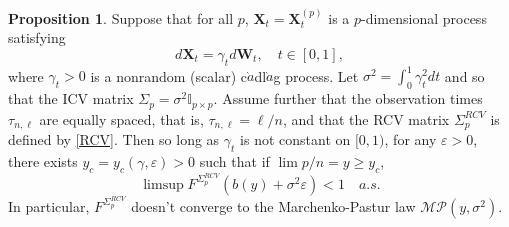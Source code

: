 \documentclass[a4paper,11pt]{article}
\theoremstyle{plain}
\theoremstyle{definition}
\newtheorem{prps}[thm]{Proposition}
\begin{document}
	\begin{prps}
		Suppose that for all $p$, $\mathbf{X}_t=\mathbf{X}_t^{(p)}$ is a $p$-dimensional process satisfying
		\begin{equation}
		d \mathbf{X}_t = \gamma_t d\mathbf{W}_t, \quad t \in [0, 1],
		\end{equation}
		where $\gamma_t > 0$ is a nonrandom (scalar) c$\grave{a}$dl$\grave{a}$g process. Let $\sigma^2 = \int_0^1 \gamma_t^2 dt$ and so that the ICV matrix $\Sigma_p = \sigma^2 \mathbb{I}_{p \times p}$. Assume further that the observation times $\tau_{n,\ell}$ are equally spaced, that is, $\tau_{n, \ell} = \ell / n$, and that the RCV matrix $\Sigma_p^{RCV}$ is defined by \eqref{RCV}. Then so long as $\gamma_t$ is not constant on $[0, 1)$, for any $\varepsilon > 0$, there exists $y_c = y_c(\gamma, \varepsilon) > 0$ such that if $\lim p/n = y \geq y_c$,
		\begin{equation}
			\limsup F^{\Sigma_p^{RCV}}(b(y)+\sigma^2\varepsilon) < 1 \quad a.s.
		\end{equation}
		In particular, $F^{\Sigma_p^{RCV}}$ doesn't converge to the Marchenko-Pastur law $\mathcal{MP}(y, \sigma^2)$.
    \end{prps}
    
\end{document}
